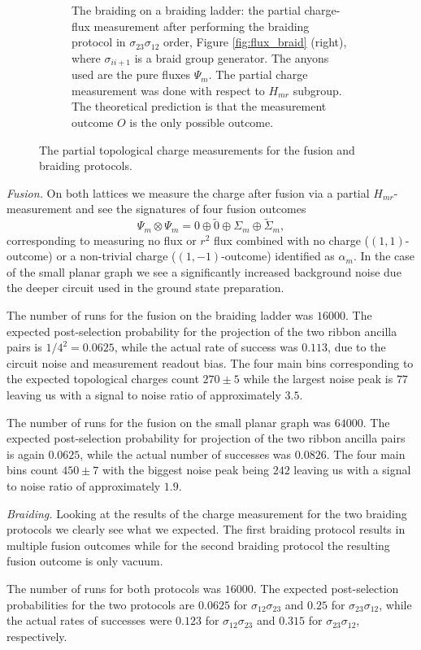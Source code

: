 \documentclass[a4paper,twocolumn,11pt, accepted=2024-06-14]{quantumarticle}
\begin{document}
\begin{figure}
\begin{subfigure}{0.47\textwidth}
    \caption{The braiding on a braiding ladder: the partial charge-flux measurement after performing the braiding protocol in $\sigma_{23}\sigma_{12}$ order, Figure \ref{fig:flux_braid} (right), where $\sigma_{ii+1}$ is a braid group generator. The anyons used are the pure fluxes $\Psi_m$. The partial charge measurement was done with respect to $H_{mr}$ subgroup. The theoretical prediction is that the measurement outcome $O$ is the only possible outcome.}
    \label{fig:braid_link}
\end{subfigure}
\caption{The partial topological charge measurements for the fusion and braiding protocols.}
\label{fig:red_charge_res}
\end{figure}

\emph{Fusion.} 
On both lattices we measure the charge after fusion via a partial $H_{mr}$-measurement and see the signatures of four fusion outcomes
$$\Psi_m \otimes \Psi_m = 0 \oplus \tilde 0 \oplus \Sigma_m \oplus \tilde{\Sigma}_m,$$
corresponding to measuring no flux or $r^2$ flux combined with no charge ($(1,1)$-outcome) or a non-trivial charge ($(1,-1)$-outcome) identified as $\alpha_m$.
In the case of the small planar graph we see a significantly 
increased background noise due the deeper circuit used in the ground state preparation.

The number of runs for the fusion on the braiding ladder was $16000$. The expected post-selection probability for the projection of the two ribbon ancilla pairs is $1/4^2=0.0625$, while the actual rate of success was $0.113$, due to the circuit noise and measurement readout bias. The four main bins corresponding to the expected topological charges count $270\pm5$ while the largest noise peak is $77$ leaving us with a signal to noise ratio of approximately $3.5$. 

The number of runs for the fusion on the small planar graph was $64000$. The expected post-selection probability for projection of the two ribbon ancilla pairs is again $0.0625$, while the actual number of successes was $0.0826$. The four main bins count $450\pm7$ with the biggest noise peak being $242$ leaving us with a signal to noise ratio of approximately $1.9$.

\emph{Braiding.}
Looking at the results of the charge measurement for the two braiding protocols we clearly see what we expected. The first braiding protocol results in multiple fusion outcomes while for the second braiding protocol the resulting fusion outcome is only vacuum.


The number of runs for both protocols was $16000$. The expected post-selection probabilities for the two protocols are $0.0625$ for $\sigma_{12}\sigma_{23}$ and $0.25$ for $\sigma_{23}\sigma_{12}$, while the actual rates of successes were $0.123$ for $\sigma_{12}\sigma_{23}$ and $0.315$ for $\sigma_{23}\sigma_{12}$, respectively.
\end{document}

